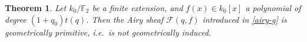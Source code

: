 \documentclass[11pt]{amsart}
\theoremstyle{plain}
\newtheorem{thm}{Theorem}
\theoremstyle{definition}
\numberwithin{thm}{section}
\numberwithin{equation}{thm}
\newcommand{\Trace}{{\rm Trace}}
\newcommand{\sF}{{\mathcal F}}
\newcommand{\F}{{\mathbb F}}
\newcommand{\0}{\emptyset}
\begin{document}
  
 
 
 \begin{thm}\label{generalprim}Let $k_0/\F_2$ be a finite extension, and $f(x) \in k_0[x]$ a polynomial of degree $(1+q_0)t(q)$. Then 
 the Airy sheaf $\sF(q,f)$ introduced in \eqref{airy-g}  
  is geometrically primitive, i.e.\ is not geometrically induced.
 \end{thm}
\end{document}
